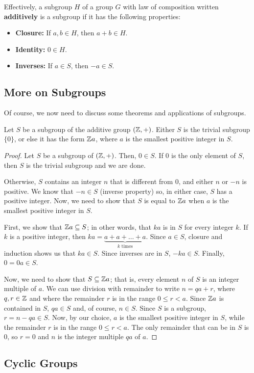 \documentclass[letterpaper]{article}
\begin{document}
Effectively, a subgroup $H$ of a group $G$ with law of composition written \textbf{additively} is a subgroup if it has the following properties: 
\begin{itemize}
    \item \textbf{Closure:} If $a, b \in H$, then $a + b \in H$. 
    \item \textbf{Identity:} $0 \in H$. 
    \item \textbf{Inverses:} If $a \in S$, then $-a \in S$. 
\end{itemize}

\subsection{More on Subgroups}
Of course, we now need to discuss some theorems and applications of subgroups. 
\begin{theorem}{}{}
    Let $S$ be a subgroup of the additive group $(\mathbb{Z}, +)$. Either $S$ is the trivial subgroup $\{0\}$, or else it has the form $\mathbb{Z} a$, where $a$ is the smallest positive integer in $S$. 
\end{theorem}

\begin{mdframed}
    \begin{proof}
        Let $S$ be a subgroup of $(\mathbb{Z}, +)$. Then, $0 \in S$. If 0 is the only element of $S$, then $S$ is the trivial subgroup and we are done. 

        \bigskip 

        Otherwise, $S$ contains an integer $n$ that is different from 0, and either $n$ or $-n$ is positive. We know that $-n \in S$ (inverse property) so, in either case, $S$ has a positive integer. Now, we need to show that $S$ is equal to $\mathbb{Z} a$ when $a$ is the smallest positive integer in $S$. 

        \bigskip 

        First, we show that $\mathbb{Z} a \subseteq S$; in other words, that $ka$ is in $S$ for every integer $k$. If $k$ is a positive integer, then $ka = \underbrace{a + a + \dots + a}_{k \text{ times}}$. Since $a \in S$, closure and induction shows us that $ka \in S$. Since inverses are in $S$, $-ka \in S$. Finally, $0 = 0a \in S$. 

        \bigskip 

        Now, we need to show that $S \subseteq \mathbb{Z} a$; that is, every element $n$ of $S$ is an integer multiple of $a$. We can use division with remainder to write $n = qa + r$, where $q, r \in \mathbb{Z}$ and where the remainder $r$ is in the range $0 \leq r < a$. Since $\mathbb{Z} a$ is contained in $S$, $qa \in S$ and, of course, $n \in S$. Since $S$ is a subgroup, $r = n - qa \in S$. Now, by our choice, $a$ is the smallest positive integer in $S$, while the remainder $r$ is in the range $0 \leq r < a$. The only remainder that can be in $S$ is 0, so $r = 0$ and $n$ is the integer multiple $qa$ of $a$. 
    \end{proof}
\end{mdframed}

\subsection{Cyclic Groups}
\end{document}
